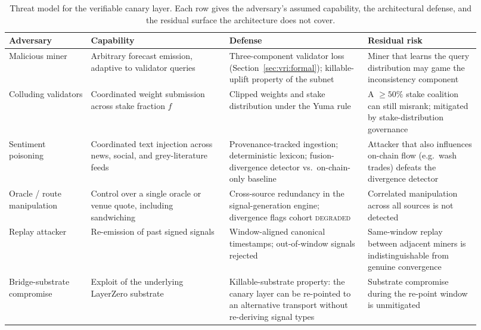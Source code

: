 \documentclass[journal]{IEEEtran}
\begin{document}
\begin{table}[t]
\centering
\footnotesize
\caption{Threat model for the verifiable canary layer. Each row gives
the adversary's assumed capability, the architectural defense, and the
residual surface the architecture does not cover.}
\label{tab:threat-model}
\renewcommand{\arraystretch}{1.15}
\begin{tabular}{@{}p{0.16\linewidth} p{0.27\linewidth} p{0.27\linewidth} p{0.22\linewidth}@{}}
\toprule
\textbf{Adversary} & \textbf{Capability} & \textbf{Defense} &
\textbf{Residual risk} \\
\midrule
Malicious miner & Arbitrary forecast emission, adaptive to validator
queries & Three-component validator loss
(Section~\ref{sec:vri:formal}); killable-uplift property of the subnet
& Miner that learns the query distribution may game the inconsistency
component \\
Colluding validators & Coordinated weight submission across stake
fraction $f$ & Clipped weights and stake distribution under the Yuma
rule~\cite{opentensor2024yuma} & A $\geq 50\%$ stake coalition can
still misrank; mitigated by stake-distribution governance \\
Sentiment poisoning & Coordinated text injection across news, social,
and grey-literature feeds & Provenance-tracked ingestion;
deterministic lexicon; fusion-divergence detector vs.\ on-chain-only
baseline & Attacker that also influences on-chain flow (e.g.\ wash
trades) defeats the divergence detector~\cite{cong2022crypto} \\
Oracle / route manipulation & Control over a single oracle or venue
quote, including sandwiching~\cite{daian2020flash} & Cross-source
redundancy in the signal-generation engine; divergence flags cohort
\textsc{degraded} & Correlated manipulation across all sources is
not detected \\
Replay attacker & Re-emission of past signed signals & Window-aligned
canonical timestamps; out-of-window signals rejected & Same-window
replay between adjacent miners is indistinguishable from genuine
convergence \\
Bridge-substrate compromise & Exploit of the underlying LayerZero
substrate~\cite{ZhangZZL24,augusto2024sok} & Killable-substrate
property: the canary layer can be re-pointed to an alternative
transport without re-deriving signal types & Substrate compromise
during the re-point window is unmitigated \\
\bottomrule
\end{tabular}
\end{table}
\end{document}
